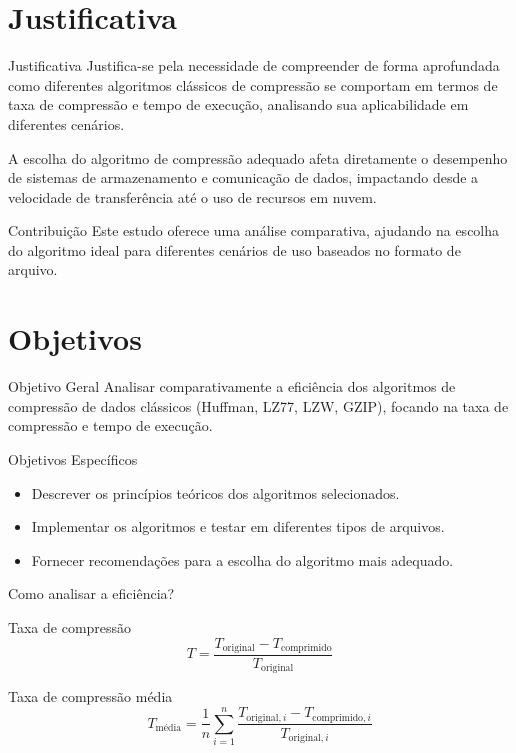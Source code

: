 \documentclass{beamer}
\begin{document}
    \section{Justificativa}
    \begin{frame}{Justificativa}
    Justifica-se pela necessidade de compreender de forma aprofundada como diferentes algoritmos clássicos de compressão
    se comportam em termos de taxa de compressão e tempo de execução, analisando sua aplicabilidade em diferentes
    cenários.     

    A escolha do algoritmo de compressão adequado afeta diretamente o desempenho de sistemas de armazenamento e comunicação de dados, impactando desde a velocidade de transferência até o uso de recursos em nuvem.
        
        \begin{block}{Contribuição}
            Este estudo oferece uma análise comparativa, ajudando na escolha do algoritmo ideal para diferentes cenários de uso baseados no formato de arquivo.
        \end{block}
    \end{frame}

    \section{Objetivos}
    \begin{frame}{Objetivo Geral}
        Analisar comparativamente a eficiência dos algoritmos de compressão de dados clássicos (Huffman, LZ77, LZW, GZIP), focando na taxa de compressão e tempo de execução.
    \end{frame}
    
    \begin{frame}{Objetivos Específicos}
        \begin{itemize}
            \item Descrever os princípios teóricos dos algoritmos selecionados.
            \item Implementar os algoritmos e testar em diferentes tipos de arquivos.
            \item Fornecer recomendações para a escolha do algoritmo mais adequado.
        \end{itemize}
    \end{frame}

    \begin{frame}{Como analisar a eficiência?}
        \begin{block}{Taxa de compressão}
            \[
            T = \frac{T_{\text{original}} - T_{\text{comprimido}}}{T_{\text{original}}}
            \]
        \end{block}

        \begin{block}{Taxa de compressão média}
            \[
            T_{\text{média}} = \frac{1}{n} \sum_{i=1}^{n} \frac{T_{\text{original}, i} - T_{\text{comprimido}, i}}{T_{\text{original}, i}}
            \]
        \end{block}
    \end{frame}
\end{document}
